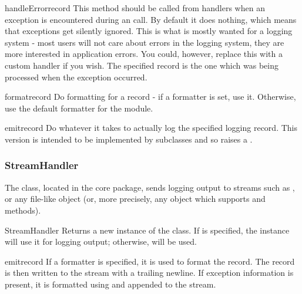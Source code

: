 \begin{methoddesc}{handleError}{record}
This method should be called from handlers when an exception is
encountered during an  call. By default it does nothing,
which means that exceptions get silently ignored. This is what is
mostly wanted for a logging system - most users will not care
about errors in the logging system, they are more interested in
application errors. You could, however, replace this with a custom
handler if you wish. The specified record is the one which was being
processed when the exception occurred.
\end{methoddesc}

\begin{methoddesc}{format}{record}
Do formatting for a record - if a formatter is set, use it.
Otherwise, use the default formatter for the module.
\end{methoddesc}

\begin{methoddesc}{emit}{record}
Do whatever it takes to actually log the specified logging record.
This version is intended to be implemented by subclasses and so
raises a .
\end{methoddesc}

\subsubsection{StreamHandler}

The  class, located in the core 
package, sends logging output to streams such as ,
 or any file-like object (or, more precisely, any
object which supports  and  methods).

\begin{classdesc}{StreamHandler}{}
Returns a new instance of the  class. If  is
specified, the instance will use it for logging output; otherwise,
 will be used.
\end{classdesc}

\begin{methoddesc}{emit}{record}
If a formatter is specified, it is used to format the record.
The record is then written to the stream with a trailing newline.
If exception information is present, it is formatted using
 and appended to the stream.
\end{methoddesc}

